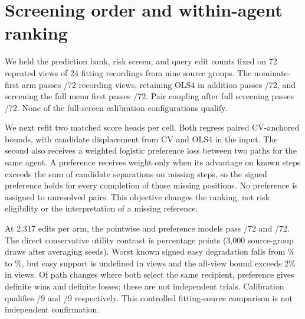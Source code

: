 \section{Screening order and within-agent ranking}
We held the prediction bank, risk screen, and query edit counts fixed on
72 repeated views of 24 fitting recordings from nine source groups.
The nominate-first arm passes \NominationNominateFirst{}/72 recording
views, retaining OLS4 in addition passes \NominationAddBack{}/72, and
screening the full menu first passes \NominationFullScreen{}/72.
Pair coupling after full screening passes \NominationJoint{}/72.
None of the full-screen calibration configurations qualify.

We next refit two matched score heads per cell. Both regress paired
CV-anchored bounds, with candidate displacement from CV and OLS4 in the
input. The second also receives a weighted logistic preference loss
between two paths for the same agent. A preference receives weight only
when its advantage on known steps exceeds the sum of candidate
separations on missing steps, so the signed preference holds for every
completion of those missing positions. No preference is assigned to
unresolved pairs. This objective changes the ranking, not risk
eligibility or the interpretation of a missing reference.

At 2,317 edits per arm, the pointwise and preference models pass
\NominationPoint{}/72 and \NominationPaired{}/72. The direct conservative
utility contrast is \NominationContrast{} percentage points (3,000
source-group draws after averaging seeds). Worst known signed easy
degradation falls from \NominationPointEasy{}\% to
\NominationPairedEasy{}\%, but easy support is undefined in
\NominationUndefinedEasy{} views and the all-view bound exceeds 2\%
in \NominationAllOver{} views. Of \NominationSharedChanged{}
path changes where both select the same recipient, preference gives
\NominationSharedWins{} definite wins and \NominationSharedLosses{}
definite losses; these are not independent trials. Calibration qualifies
\NominationPointQual{}/9 and \NominationPairedQual{}/9 respectively.
This controlled fitting-source comparison is not independent confirmation.
